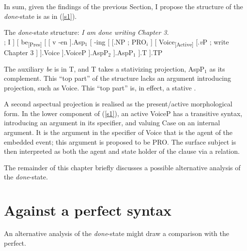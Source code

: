 \documentclass[output=paper]{langsci/langscibook}
\begin{document}
In sum, given the findings of the previous Section, I propose the structure of
the \emph{done}-state is as in (\ref{s1}).\newpage

\begin{exe}
\ex\label{s1} The \emph{done}-state structure: {\em I am done writing Chapter
3.}\\
\vspace{11pt}
    \Tree   [
                [.NP$_i$ \edge[roof]; {I} ]
                [
                    be\textsubscript{[Pres]}
                    [
                        [ v -en ].Asp$_{1}$
                        [ {-ing}
                            [
                                [.NP \edge[roof]; {PRO$_i$} ]
                                [
                                    Voice\textsubscript{[Active]}
                                    [.\emph{v}P \edge[roof]; {write Chapter 3} ]
                                ].Voice
                            ].VoiceP
                        ].AspP$_{2}$
                    ].AspP$_{1}$
                ].T
            ].TP
\end{exe}

The auxiliary \emph{be} is in T, and T takes a stativizing projection,
AspP$_{1}$ as its complement. This \enquote{top part} of the structure lacks an
argument introducing projection, such as Voice. This \enquote{top part} is, in
effect, a stative .

A second aspectual projection is realised as the present/active morphological
form. In the lower component of (\ref{s1}), an active VoiceP has a transitive
syntax, introducing an argument in its specifier, and valuing Case on an
internal argument. It is the argument in the specifier of Voice that is the
agent of the embedded event; this argument is proposed to be PRO\@. The surface
subject is then interpreted as both the agent and state holder of the clause
via a  relation.

The remainder of this chapter briefly discusses a possible alternative analysis
of the \emph{done}-state.

\section{Against a perfect syntax}\label{derivation}

An alternative analysis of the \emph{done}-state might draw a comparison with
the  perfect.
\end{document}
